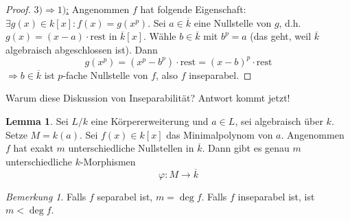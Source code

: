 \documentclass[12pt,parskip=full]{scrartcl}
\newcommand{\heading}{\underline}
\theoremstyle{definition}
\newtheorem{lemma}[theorem]{Lemma}
\theoremstyle{remark}
\newtheorem*{remark}{Bemerkung}
\begin{document}
\begin{proof}
		\heading{$3) \Rightarrow 1)$:} Angenommen $f$ hat folgende Eigenschaft: $\exists g(x) \in k[x]: f(x) = g(x^p)$. Sei $a \in \overline{k}$ eine Nullstelle von $g$, d.h. $g(x) = (x - a) \cdot \text{rest}$ in $\overline{k}[x]$. Wähle $b \in \overline{k}$ mit $b^p = a$ (das geht, weil $\overline{k}$ algebraisch abgeschlossen ist). Dann
		\begin{equation*}
			g(x^p) = (x^p - b^p) \cdot \text{rest} = (x - b)^p \cdot \text{rest}
		\end{equation*}
		$\Rightarrow b \in \overline{k}$ ist $p$-fache Nullstelle von $f$, also $f$ inseparabel.
	\end{proof}

	Warum diese Diskussion von Inseparabilität? Antwort kommt jetzt!
	
	\begin{lemma}
		Sei $L/k$ eine Körpererweiterung und $a \in L$, sei algebraisch über $k$. Setze $M = k(a)$. Sei $f(x) \in k[x]$ das Minimalpolynom von $a$. Angenommen $f$ hat exakt $m$ unterschiedliche Nullstellen in $\overline{k}$. Dann gibt es genau $m$ unterschiedliche $k$-Morphismen
		\begin{equation*}
			\varphi: M \to \overline{k}
		\end{equation*}
	\end{lemma}

	\begin{remark}
		Falls $f$ separabel ist, $m = \deg f$. Falls $f$ inseparabel ist, ist $m < \deg f$.
	\end{remark}
\end{document}
